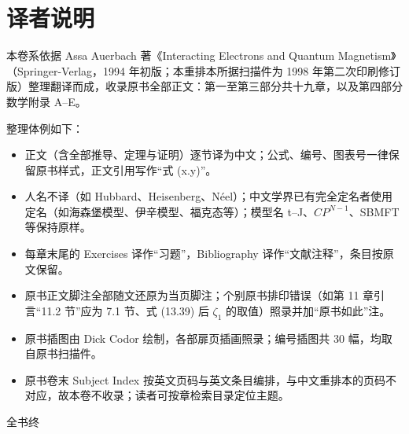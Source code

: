 \chapter*{译者说明}

本卷系依据 Assa Auerbach 著《Interacting Electrons and Quantum Magnetism》（Springer-Verlag，1994 年初版；本重排本所据扫描件为 1998 年第二次印刷修订版）整理翻译而成，收录原书全部正文：第一至第三部分共十九章，以及第四部分数学附录 A--E。

整理体例如下：

\begin{itemize}[leftmargin=2em, itemsep=2pt]
\item 正文（含全部推导、定理与证明）逐节译为中文；公式、编号、图表号一律保留原书样式，正文引用写作“式 (x.y)”。
\item 人名不译（如 Hubbard、Heisenberg、Néel）；中文学界已有完全定名者使用定名（如海森堡模型、伊辛模型、福克态等）；模型名 t--J、$CP^{N-1}$、SBMFT 等保持原样。
\item 每章末尾的 Exercises 译作“习题”，Bibliography 译作“文献注释”，条目按原文保留。
\item 原书正文脚注全部随文还原为当页脚注；个别原书排印错误（如第 11 章引言“11.2 节”应为 7.1 节、式 (13.39) 后 $\zeta_1$ 的取值）照录并加“原书如此”注。
\item 原书插图由 Dick Codor 绘制，各部扉页插画照录；编号插图共 30 幅，均取自原书扫描件。
\item 原书卷末 Subject Index 按英文页码与英文条目编排，与中文重排本的页码不对应，故本卷不收录；读者可按章检索目录定位主题。
\end{itemize}

\vspace{2em}
\begin{center}
{\kaishu 全书终}
\end{center}
